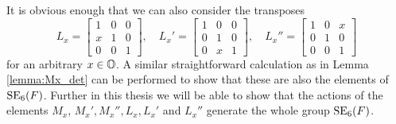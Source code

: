 It is obvious enough that we can also consider the transposes 
\begin{equation}
	L_x = \begin{bmatrix}
		1 & 0 & 0 \\
		x & 1 & 0 \\
		0 & 0 & 1
	\end{bmatrix},\quad 
	L_x' = \begin{bmatrix}
		1 & 0 & 0 \\
		0 & 1 & 0 \\
		0 & x & 1 
	\end{bmatrix},\quad 
	L_x'' = \begin{bmatrix}
		1 & 0 & x \\
		0 & 1 & 0 \\
		0 & 0 & 1
	\end{bmatrix}
\end{equation}
for an arbitrary $x \in \mathbb{O}$. 
A similar straightforward calculation as in Lemma \ref{lemma:Mx_det} can be performed
to show that these are also the elements of $\mathrm{SE}_6(F)$. 
Further in this thesis we will be able to show that the actions of the elements
$M_x$, $M_x',M_x'',L_x,L_x'$ and $L_x''$ generate the whole group $\mathrm{SE}_6(F)$.


